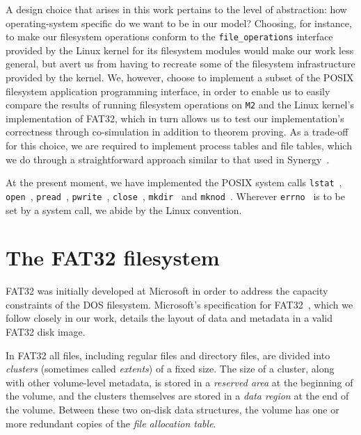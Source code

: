 \documentclass[submission,copyright,creativecommons]{eptcs}
\begin{document}
A design choice that arises in this work pertains to the level of
abstraction: how operating-system specific do we want to be in our
model? Choosing, for instance, to make our filesystem operations
conform to the \texttt{file\_operations} interface~\cite{lkmpgchap4}
provided by the
Linux kernel for its filesystem modules would make our work less
general, but avert us from having to recreate some of the filesystem
infrastructure provided by the kernel. We, however, choose to
implement a subset of the POSIX filesystem application
programming interface, in order to enable us to easily compare the
results of running filesystem operations on \texttt{M2} and the Linux
kernel's implementation of FAT32, which in turn allows us to test our
implementation's correctness through co-simulation in addition to
theorem proving. As a trade-off for this choice, we are required to
implement process tables and file tables, which we do through a
straightforward approach similar to that used in
Synergy~\cite{bevier1996executable}.

At the present moment, we have implemented the POSIX system calls
\texttt{lstat}~\cite{kerrisklstat}, \texttt{open}~\cite{kerriskopen},
\texttt{pread}~\cite{kerriskpread},
\texttt{pwrite}~\cite{kerriskpwrite},
\texttt{close}~\cite{kerriskclose},
\texttt{mkdir}~\cite{kerriskmkdir} and
\texttt{mknod}~\cite{kerriskmknod}. Wherever
\texttt{errno}~\cite{kerriskerrno} is to be
set by a system call, we abide by the Linux convention.

\section{The FAT32 filesystem}
\label{sec:fat32fs}

FAT32 was initially developed at Microsoft in order to address the
capacity constraints of the DOS filesystem. Microsoft's specification
for FAT32~\cite{microsoft2000}, which we follow closely in our work,
details the layout of data and metadata in a valid FAT32 disk image.

In FAT32 all files, including regular files and directory files, are
divided into \textit{clusters} (sometimes called \textit{extents}) of
a fixed size. The size of a cluster, along with other volume-level
metadata, is stored in a \textit{reserved area} at the beginning of
the volume, and the clusters themselves are stored in a \textit{data
  region} at the end of the volume. Between these two on-disk data
structures, the volume has one or more redundant copies of the
\textit{file allocation table}.
\end{document}
